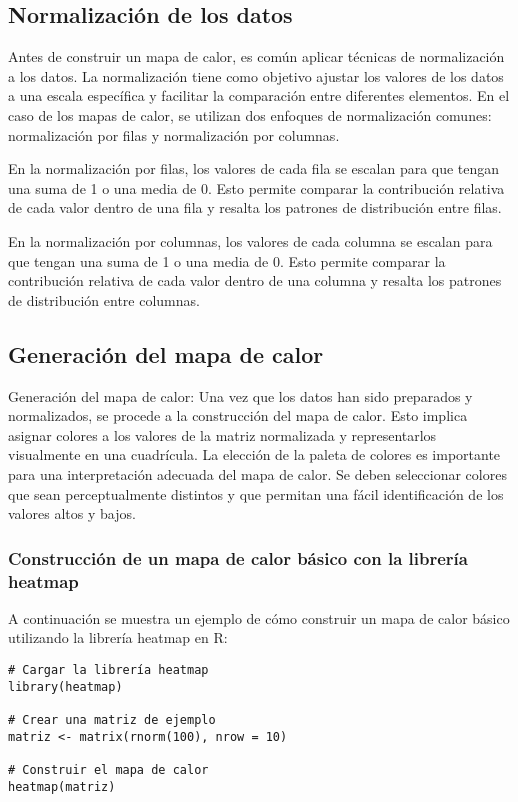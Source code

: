 \documentclass{article}
\begin{document}
\subsection{Normalizaci\'on de los datos}
Antes de construir un mapa de calor, es común aplicar técnicas de normalización a los datos. La normalización tiene como objetivo ajustar los valores de los datos a una escala específica y facilitar la comparación entre diferentes elementos. En el caso de los mapas de calor, se utilizan dos enfoques de normalización comunes: normalización por filas y normalización por columnas.

En la normalización por filas, los valores de cada fila se escalan para que tengan una suma de 1 o una media de 0. Esto permite comparar la contribución relativa de cada valor dentro de una fila y resalta los patrones de distribución entre filas.

En la normalización por columnas, los valores de cada columna se escalan para que tengan una suma de 1 o una media de 0. Esto permite comparar la contribución relativa de cada valor dentro de una columna y resalta los patrones de distribución entre columnas.

\subsection{Generaci\'on del mapa de calor}
Generación del mapa de calor: Una vez que los datos han sido preparados y normalizados, se procede a la construcción del mapa de calor. Esto implica asignar colores a los valores de la matriz normalizada y representarlos visualmente en una cuadrícula. La elección de la paleta de colores es importante para una interpretación adecuada del mapa de calor. Se deben seleccionar colores que sean perceptualmente distintos y que permitan una fácil identificación de los valores altos y bajos.

\subsubsection{Construcción de un mapa de calor básico con la librería heatmap}
A continuación se muestra un ejemplo de cómo construir un mapa de calor básico utilizando la librería heatmap en R:

\begin{verbatim}
# Cargar la librería heatmap
library(heatmap)

# Crear una matriz de ejemplo
matriz <- matrix(rnorm(100), nrow = 10)

# Construir el mapa de calor
heatmap(matriz)
\end{verbatim}
\end{document}
